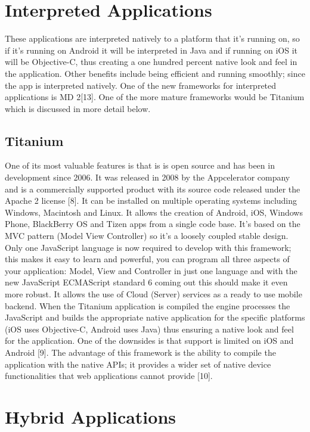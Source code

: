 \section{Interpreted Applications}

These applications are interpreted natively to a platform that it’s running
on, so if it’s running on Android it will be interpreted in Java and if running
on iOS it will be Objective-C, thus creating a one hundred percent native look
and feel in the application. Other benefits include being efficient and running
smoothly; since the app is interpreted natively. One of the new frameworks
for interpreted applications is MD 2[13]. One of the more mature frameworks
would be Titanium which is discussed in more detail below.

\subsection{Titanium}

One of its most valuable features is that is is open source and has been in
development since 2006. It was released in 2008 by the Appcelerator
company and is a commercially supported product with its source code
released under the Apache 2 license [8]. It can be installed on multiple
operating systems including Windows, Macintosh and Linux. It allows the
creation of Android, iOS, Windows Phone, BlackBerry OS and Tizen apps
from a single code base. It’s based on the MVC pattern (Model View
Controller) so it’s a loosely coupled stable design. Only one JavaScript
language is now required to develop with this framework; this makes it easy
to learn and powerful, you can program all three aspects of your application:
Model, View and Controller in just one language and with the new JavaScript
ECMAScript standard 6 coming out this should make it even more robust. It
allows the use of Cloud (Server) services as a ready to use mobile backend.
When the Titanium application is compiled the engine processes the
JavaScript and builds the appropriate native application for the specific
platforms (iOS uses Objective-C, Android uses Java) thus ensuring a native
look and feel for the application. One of the downsides is that support is
limited on iOS and Android [9]. The advantage of this framework is the ability
to compile the application with the native APIs; it provides a wider set of
native device functionalities that web applications cannot provide [10].

\section{Hybrid Applications}

